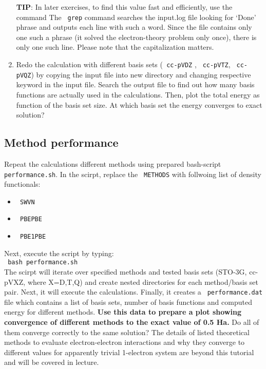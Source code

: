 \begin{enumerate}
\begin{tip}
\textbf{TIP}: 
 In later exercises, to find this value fast and efficiently, use the command
\newline
{} 
\newline
The \texttt{ grep} command searches the input.log file looking for `Done' phrase and outputs each line with such a word. Since the file contains only one such a phrase (it solved the electron-theory problem only once), there is only one such line. Please note that the capitalization matters. 
\end{tip}

\item Redo the calculation with different basis sets (\texttt{ cc-pVDZ}
, \texttt{ cc-pVTZ}, \texttt{ cc-pVQZ}) by copying the input file into new directory and changing respective keyword in the input file. 
Search the output file to find out how many basis functions are actually used in the calculations. Then, plot the total energy as function of the basis set size. At which basis set the energy converges to exact solution? 
\end{enumerate}

\subsection*{Method performance}

Repeat the calculations different methods using prepared bash-script \texttt{ performance.sh}. In the scirpt, replace the \texttt{ METHODS} with follwoing list of density functionals: 
\begin{itemize}
\item\texttt{ SWVN}
\item\texttt{ PBEPBE}
\item\texttt{ PBE1PBE}
\end{itemize}
 Next, execute the script by typing: \\
 \texttt{ bash performance.sh} \\
 The scirpt will iterate over specified methods and tested basis sets (STO-3G, cc-pVXZ, where X=D,T,Q) and create nested directories for each method/basis set pair. Next, it will execute the calculations. Finally, it creates a \texttt{ performance.dat} file which contains a list of basis sets, number of basis functions and computed energy for different methods. \textbf{ Use this data to prepare a plot showing convergence of different methods to the exact value of 0.5 Ha.} Do all of them converge correctly to the same solution? The details of listed theoretical methods to evaluate electron-electron interactions and why they converge to different values for apparently trivial 1-electron system are beyond this tutorial and will be covered in lecture. 

